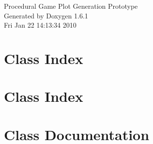 \documentclass[a4paper]{book}
\begin{document}
\hypersetup{pageanchor=false}
\begin{titlepage}
\vspace*{7cm}
\begin{center}
{\Large Procedural Game Plot Generation Prototype }\\
\vspace*{1cm}
{\large Generated by Doxygen 1.6.1}\\
\vspace*{0.5cm}
{\small Fri Jan 22 14:13:34 2010}\\
\end{center}
\end{titlepage}
\clearemptydoublepage
{}
\tableofcontents
\clearemptydoublepage
{}
\hypersetup{pageanchor=true}
\chapter{Class Index}

\chapter{Class Index}

\chapter{Class Documentation}

















\printindex
\end{document}
